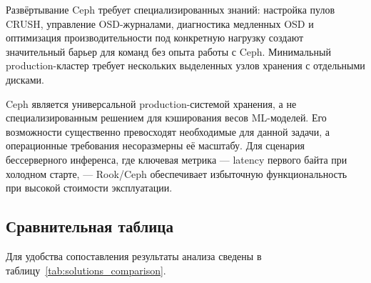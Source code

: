  Развёртывание Ceph требует специализированных знаний: настройка пулов CRUSH, управление OSD-журналами, диагностика медленных OSD и оптимизация производительности под конкретную нагрузку создают значительный барьер для команд без опыта работы с Ceph. Минимальный production-кластер требует нескольких выделенных узлов хранения с отдельными дисками.

Ceph является универсальной production-системой хранения, а не специализированным решением для кэширования весов ML-моделей. Его возможности существенно превосходят необходимые для данной задачи, а операционные требования несоразмерны её масштабу. Для сценария бессерверного инференса, где ключевая метрика --- latency первого байта при холодном старте, --- Rook/Ceph обеспечивает избыточную функциональность при высокой стоимости эксплуатации.

\subsection{Сравнительная таблица}
\label{sec:comparison_table}

Для удобства сопоставления результаты анализа сведены в таблицу~\ref{tab:solutions_comparison}.

